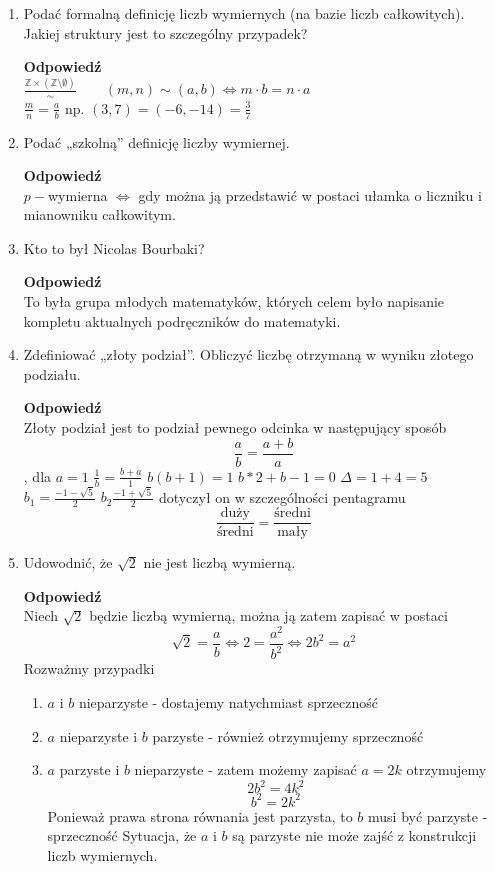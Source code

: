 \documentclass[12pt,a4paper]{article}
\theoremstyle{break}
\newcommand{\Odp}[1]{
		\begin{mdframed}[style=zadanie]
			\textbf{Odpowiedź}\\
			#1
		\end{mdframed}
	}
\begin{document}
\begin{enumerate}[1.]
	\item Podać formalną definicję liczb wymiernych (na bazie liczb całkowitych). Jakiej struktury jest to szczególny przypadek?
	\Odp{
	$\frac{\mathbb{Z}\times (\mathbb{Z}\setminus\emptyset)}{\sim} \qquad (m,n)\sim (a,b) \Leftrightarrow m\cdot b=n\cdot a$\\
	$\frac{m}{n}=\frac{a}{b}$ np. $(3,7)=(-6,-14)=\frac{3}{7}$
	}
	
	\item Podać „szkolną” definicję liczby wymiernej.
	\Odp{
		$p-$wymierna $\Leftrightarrow$ gdy można ją przedstawić w postaci ułamka o liczniku i mianowniku całkowitym.
	}
	
	\item Kto to był Nicolas Bourbaki?
	\Odp{
		To była grupa młodych matematyków, których celem było napisanie kompletu aktualnych podręczników do matematyki.
	}
	
	\item Zdefiniować „złoty podział”. Obliczyć liczbę otrzymaną w wyniku złotego podziału.
	\Odp{Złoty podział jest to podział pewnego odcinka w następujący sposób
	$$\frac{a}{b}=\frac{a+b}{a}$$, dla $a=1$
	$\frac{1}{b}=\frac{b+a}{1}$
	$b(b+1)=1$
	$b*2+b-1=0$
	$\Delta=1+4=5$
	$b_1=\frac{-1-\sqrt{5}}{2}$
	$b_2\frac{-1+\sqrt{5}}{2}$
	dotyczył on w szczególności pentagramu
	$$\frac{\text{duży}}{\text{średni}}=\frac{\text{średni}}{\text{mały}}$$
	}
	
	\item Udowodnić, że $\sqrt{2}$ nie jest liczbą wymierną.
	\Odp{
		Niech $\sqrt{2}$ będzie liczbą wymierną, można ją zatem zapisać w postaci 
		$$\sqrt{2}=\frac{a}{b} \Leftrightarrow 2=\frac{a^2}{b^2} \Leftrightarrow 2b^2=a^2$$
		Rozważmy przypadki 
		\begin{enumerate}[1$^\circ$]
			\item $a$ i $b$ nieparzyste - dostajemy natychmiast sprzeczność
			\item $a$ nieparzyste i $b$ parzyste - również otrzymujemy sprzeczność
			\item $a$ parzyste i $b$ nieparzyste - zatem możemy zapisać $a=2k$ otrzymujemy
			$$2b^2=4k^2$$
			$$b^2=2k^2$$
			Ponieważ prawa strona równania jest parzysta, to $b$ musi być parzyste - sprzeczność
			Sytuacja, że $a$ i $b$ są parzyste nie może zajść z konstrukcji liczb wymiernych.
			
		\end{enumerate}
	}
	

\end{enumerate}
\end{document}
